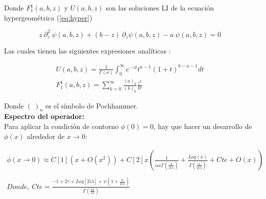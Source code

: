 Donde $F _1 ^1(a,b,z)$ y $ U(a,b,z)$ son las soluciones LI de la ecuación hypergeométrica (\ref{eq:hyper})

\begin{equation}
    z \ \partial ^2 _z \ \psi (a,b,z) + (b-z) \
    \partial _z \psi (a,b,z)
    -a \ \psi (a,b,z) = 0
\label{eq:hyper}
\end{equation}

Las cuales tienen las siguientes expresiones analíticas  : 

\begin{equation}
\begin{array}{c}
	U(a,b,z) = \frac{1}{\Gamma (a)} 
	\int _0 ^{\infty} e ^{-zt}
	t ^{a-1}
	(1+t) ^{b-a-1}
	dt \\
	F _1 ^1 (a,b,z) = \sum _ {k=0} ^{\infty} 
	\frac{(a) _k}{(b) _k} 
	\frac{z ^k}{k!} 
\end{array}
\end{equation}

Donde $( \   ) _n$ es el símbolo de Pochhammer. \\






\textbf{Espectro del operador:} \\


Para aplicar la condición de contorno $\phi (0) = 0$, hay que hacer un desarrollo de $\phi(x)$  alrededor de $x \rightarrow 0$:

\begin{equation}
\begin{array}{c}
\phi (x \rightarrow 0) \approx
C[1] ( x + O(x ^2)) + 
C[2] x 
\left( 
\frac{1}{  \alpha x  \Gamma ( \frac{ \alpha}{2 i \lambda}  )   }  +
\frac{Log(x) }{\Gamma ( \frac{ \alpha}{2 i \lambda} ) } + Cte + O(x)
\right)
\\ \\
Donde,  \ Cte = 
\frac{
-1 + 2 \gamma + Log[2 i \lambda] + \psi (1 + \frac{ \alpha}{2 i \lambda})
}
{\Gamma (\frac{i \alpha}{2 \lambda})}
\end{array}
\label{eq.scat}
\end{equation}


